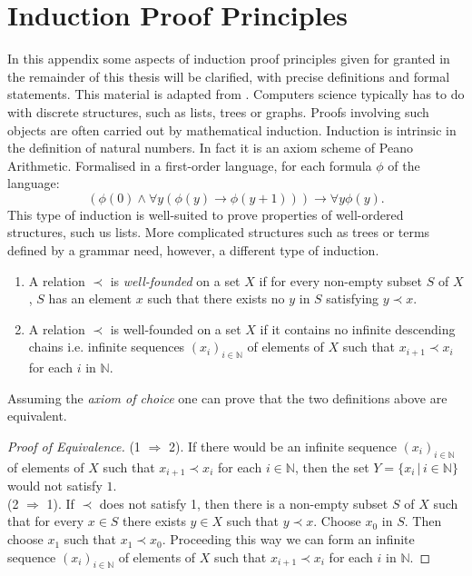 \chapter{Induction Proof Principles}
In this appendix some aspects of induction proof principles given for granted in the remainder of this thesis will be clarified, with precise definitions and formal statements. This material is adapted from \cite{hrbacek_introduction_1999}. Computers science typically has to do with discrete structures, such as lists, trees or graphs. Proofs involving such objects are often carried out by mathematical induction. Induction is intrinsic in the definition of natural numbers. In fact it is an axiom scheme of Peano Arithmetic. Formalised in a first-order language, for each formula $\phi$ of the language:
$$
(\phi(0)\land\forall y (\phi(y)\rightarrow\phi(y+1)))\rightarrow\forall y\phi(y).
$$
This type of induction is well-suited to prove properties of well-ordered structures, such us lists. More complicated structures such as trees or terms defined by a grammar need, however, a different type of induction.
\begin{definition}\hfill
	\begin{enumerate}
	\item A relation $\prec$ is \emph{well-founded} on a set $X$ if for every non-empty subset $S$ of $X$, $S$ has an  element $x$ such that there exists no $y$ in $S$ satisfying $y\prec x$.
	\item A relation $\prec$ is well-founded on a set $X$ if it contains no infinite descending chains i.e. infinite sequences $(x_i)_{i\in\mathbb{N}}$ of elements of $X$ such that $x_{i+1}\prec x_i$ for each $i$ in $\mathbb{N}$.
	\end{enumerate}
\end{definition}
Assuming the \emph{axiom of choice} one can prove that the two definitions above are equivalent.
\begin{proof}[Proof of Equivalence]
	(1 $\Rightarrow$ 2). If there would be an infinite sequence $(x_i)_{i\in\mathbb{N}}$ of elements of $X$ such that $x_{i+1}\prec x_i$ for each $i\in\mathbb{N}$, then the set $Y=\{x_i\,|\,i\in\mathbb{N}\}$ would not satisfy $1$.\\
	(2 $\Rightarrow$ 1). If $\prec$ does not satisfy 1, then there is a non-empty subset $S$ of $X$ such that for every $x\in S$ there exists $y\in X$ such that $y\prec x$. Choose $x_0$ in $S$. Then choose $x_1$ such that $x_1\prec x_0$. Proceeding this way we can form an infinite sequence $(x_i)_{i\in\mathbb{N}}$ of elements of $X$ such that $x_{i+1}\prec x_i$ for each $i$ in $\mathbb{N}$.
\end{proof}
